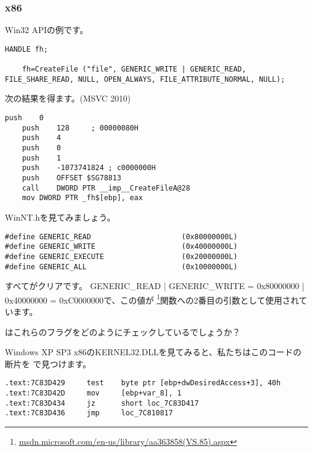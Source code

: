﻿\subsubsection{x86}

Win32 APIの例です。

\begin{lstlisting}[style=customc]
	HANDLE fh;

	fh=CreateFile ("file", GENERIC_WRITE | GENERIC_READ, FILE_SHARE_READ, NULL, OPEN_ALWAYS, FILE_ATTRIBUTE_NORMAL, NULL);
\end{lstlisting}

次の結果を得ます。(MSVC 2010)

\begin{lstlisting}[caption=MSVC 2010,style=customasmx86]
	push	0
	push	128		; 00000080H
	push	4
	push	0
	push	1
	push	-1073741824	; c0000000H
	push	OFFSET $SG78813
	call	DWORD PTR __imp__CreateFileA@28
	mov	DWORD PTR _fh$[ebp], eax
\end{lstlisting}

WinNT.hを見てみましょう。

\begin{lstlisting}[caption=WinNT.h,style=customc]
#define GENERIC_READ                     (0x80000000L)
#define GENERIC_WRITE                    (0x40000000L)
#define GENERIC_EXECUTE                  (0x20000000L)
#define GENERIC_ALL                      (0x10000000L)
\end{lstlisting}

すべてがクリアです。
GENERIC\_READ | GENERIC\_WRITE = 0x80000000 | 0x40000000 = 0xC0000000で、この値が
\footnote{\href{http://go.yurichev.com/17065}{msdn.microsoft.com/en-us/library/aa363858(VS.85).aspx}}関数への2番目の引数として使用されています。

 はこれらのフラグをどのようにチェックしているでしょうか？

Windows XP SP3 x86のKERNEL32.DLLを見てみると、私たちはこのコードの断片を  で見つけます。

\begin{lstlisting}[caption=KERNEL32.DLL (Windows XP SP3 x86),style=customasmx86]
.text:7C83D429     test    byte ptr [ebp+dwDesiredAccess+3], 40h
.text:7C83D42D     mov     [ebp+var_8], 1
.text:7C83D434     jz      short loc_7C83D417
.text:7C83D436     jmp     loc_7C810817
\end{lstlisting}


